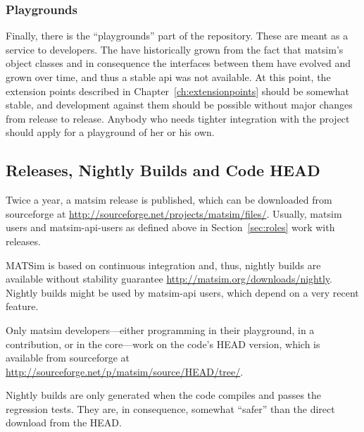 
\subsubsection{Playgrounds}
Finally, there is the ``playgrounds'' part of the repository.  These are meant as a service to developers.  The have historically grown from the fact that \gls{matsim}'s object classes and in consequence the interfaces between them have evolved and grown over time, and thus a stable \gls{api} was not available.  At this point, the extension points described in Chapter~\ref{ch:extensionpoints} should be somewhat stable, and development against them should be possible without major changes from release to release.  Anybody who needs tighter integration with the project should apply for a playground of her or his own.  

\subsection{Releases, Nightly Builds and Code HEAD}
\label{sec:releases-builds}
Twice a year, a \gls{matsim} release is published, which can be downloaded from \gls{sourceforge} at \url{http://sourceforge.net/projects/matsim/files/}. Usually, \gls{matsim} users and \gls{matsim}-\gls{api}-users as defined above in Section~\ref{sec:roles} work with releases. 

MATSim is based on continuous integration and, thus, nightly builds are available without stability guarantee \url{http://matsim.org/downloads/nightly}. Nightly builds might be used by \gls{matsim}-\gls{api} users, which depend on a very recent feature. 

Only \gls{matsim} developers---either programming in their playground, in a \gls{contribution}, or in the core---work on the code's HEAD version, which is available from \gls{sourceforge} at \url{http://sourceforge.net/p/matsim/source/HEAD/tree/}.

Nightly builds are only generated when the code compiles and passes the regression tests.  They are, in consequence, somewhat ``safer'' than the direct download from the HEAD.

